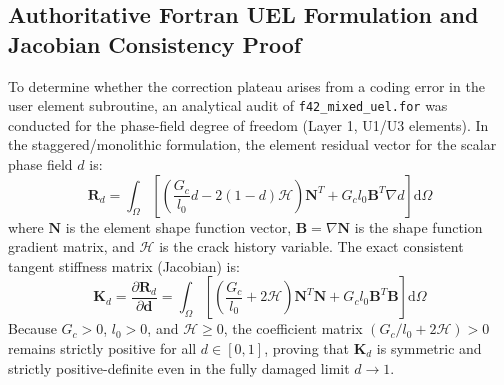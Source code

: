 \subsection{Authoritative Fortran UEL Formulation and Jacobian Consistency Proof}
\label{subsec:stage14uag_jacobian_proof}

To determine whether the correction plateau arises from a coding error in the user element subroutine, an analytical audit of \texttt{f42\_mixed\_uel.for} was conducted for the phase-field degree of freedom (Layer 1, U1/U3 elements). In the staggered/monolithic formulation, the element residual vector for the scalar phase field $d$ is:
\begin{equation}
  \mathbf{R}_d = \int_\Omega \left[ \left( \frac{G_c}{l_0} d - 2 (1-d) \mathcal{H} \right) \mathbf{N}^T + G_c l_0 \mathbf{B}^T \nabla d \right] \mathrm{d}\Omega
  \label{eq:uel_phase_residual}
\end{equation}
where $\mathbf{N}$ is the element shape function vector, $\mathbf{B} = \nabla \mathbf{N}$ is the shape function gradient matrix, and $\mathcal{H}$ is the crack history variable. The exact consistent tangent stiffness matrix (Jacobian) is:
\begin{equation}
  \mathbf{K}_d = \frac{\partial \mathbf{R}_d}{\partial \mathbf{d}} = \int_\Omega \left[ \left( \frac{G_c}{l_0} + 2 \mathcal{H} \right) \mathbf{N}^T \mathbf{N} + G_c l_0 \mathbf{B}^T \mathbf{B} \right] \mathrm{d}\Omega
  \label{eq:uel_phase_jacobian}
\end{equation}
Because $G_c > 0$, $l_0 > 0$, and $\mathcal{H} \ge 0$, the coefficient matrix $(G_c/l_0 + 2\mathcal{H}) > 0$ remains strictly positive for all $d \in [0, 1]$, proving that $\mathbf{K}_d$ is symmetric and strictly positive-definite even in the fully damaged limit $d \to 1$.

